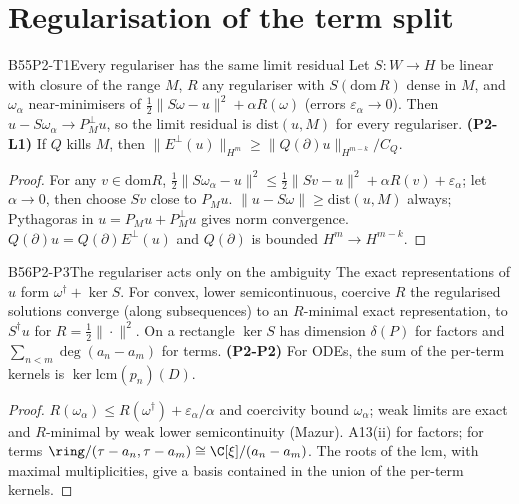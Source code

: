 \section{Regularisation of the term split}

\begin{dimcard}{B55}{P2-T1}{Every regulariser has the same limit residual}{\proved}{}
\label{dim:P2-L1}%
Let $S:W\to H$ be linear with closure of the range $M$, $R$ any regulariser with $S(\mathrm{dom}\,R)$ dense in $M$, and $\omega_\alpha$ near-minimisers of $\tfrac12\|S\omega-u\|^2+\alpha R(\omega)$ (errors $\varepsilon_\alpha\to0$). Then $u-S\omega_\alpha\to P_M^\perp u$, so the limit residual is $\mathrm{dist}(u,M)$ for every regulariser. \textbf{(P2-L1)} If $Q$ kills $M$, then $\|E^\perp(u)\|_{H^m}\ge\|Q(\partial)u\|_{H^{m-k}}/C_Q$.
\end{dimcard}
\begin{proof}
For any $v\in\mathrm{dom}R$, $\tfrac12\|S\omega_\alpha-u\|^2\le\tfrac12\|Sv-u\|^2+\alpha R(v)+\varepsilon_\alpha$; let $\alpha\to0$, then choose $Sv$ close to $P_Mu$.
$\|u-S\omega\|\ge\mathrm{dist}(u,M)$ always; Pythagoras in $u=P_Mu+P_M^\perp u$ gives norm convergence.
$Q(\partial)u=Q(\partial)E^\perp(u)$ and $Q(\partial)$ is bounded $H^m\to H^{m-k}$.
\end{proof}

\begin{dimcard}{B56}{P2-P3}{The regulariser acts only on the ambiguity}{\proved}{}
\label{dim:P2-P2}%
The exact representations of $u$ form $\omega^\dagger+\ker S$. For convex, lower semicontinuous, coercive $R$ the regularised solutions converge (along subsequences) to an $R$-minimal exact representation, to $S^\dagger u$ for $R=\tfrac12\|\cdot\|^2$. On a rectangle $\ker S$ has dimension $\delta(P)$ for factors and $\sum_{n<m}\deg(a_n-a_m)$ for terms. \textbf{(P2-P2)} For ODEs, the sum of the per-term kernels is $\ker\mathrm{lcm}(p_n)(D)$.
\end{dimcard}
\begin{proof}
$R(\omega_\alpha)\le R(\omega^\dagger)+\varepsilon_\alpha/\alpha$ and coercivity bound $\omega_\alpha$; weak limits are exact and $R$-minimal by weak lower semicontinuity (Mazur).
A13(ii) for factors; for terms $\ring/(\tau-a_n,\tau-a_m)\cong\C[\xi]/(a_n-a_m)$.
The roots of the lcm, with maximal multiplicities, give a basis contained in the union of the per-term kernels.
\end{proof}

